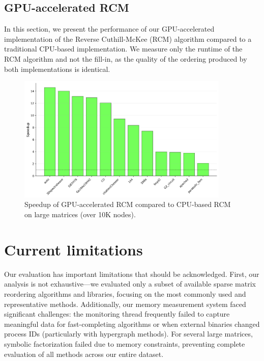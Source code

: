 \FloatBarrier

\subsection*{GPU-accelerated RCM}

In this section, we present the performance of our GPU-accelerated implementation of the Reverse Cuthill-McKee (RCM) algorithm compared to a traditional CPU-based implementation. We measure only the runtime of the RCM algorithm and not the fill-in, as the quality of the ordering produced by both implementations is identical.

\begin{figure}[H]
   \centering
   \includegraphics[width=0.9\textwidth]{fig/res/gpu_rcm_speedups_clean.png}
   \caption{Speedup of GPU-accelerated RCM compared to CPU-based RCM on large matrices (over 10K nodes).}
   \label{fig:gpu-rcm-speedups}
\end{figure}

\section{Current limitations}

Our evaluation has important limitations that should be acknowledged. First, our analysis is not exhaustive—we evaluated only a subset of available sparse matrix reordering algorithms and libraries, focusing on the most commonly used and representative methods. Additionally, our memory measurement system faced significant challenges: the monitoring thread frequently failed to capture meaningful data for fast-completing algorithms or when external binaries changed process IDs (particularly with hypergraph methods). For several large matrices, symbolic factorization failed due to memory constraints, preventing complete evaluation of all methods across our entire dataset.

